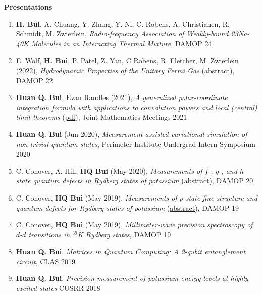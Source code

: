 \documentclass[10pt]{article}
\begin{document}

\noindent \large{\textbf{{Presentations}}}  \normalsize 

\begin{enumerate}
	\setlength\itemsep{-0pt}
	\item \textbf{H. Bui}, A. Chuang, Y. Zhang, Y. Ni, C. Robens, A. Christianen, R. Schmidt, M. Zwierlein, \textit{Radio-frequency Association of Weakly-bound 23Na-40K Molecules in an Interacting Thermal Mixture}, DAMOP 24
	
	\item E. Wolf, \textbf{H. Bui}, P. Patel, Z. Yan, C Robens, R. Fletcher, M. Zwierlein (2022), \textit{Hydrodynamic Properties of the Unitary Fermi Gas} (\href{https://meetings.aps.org/Meeting/DAMOP22/Session/N01.49}{abstract}), DAMOP 22
	
	\item \textbf{Huan Q. Bui}, Evan Randles (2021), \textit{A generalized polar-coordinate integration formula with applications to convolution powers and local (central) limit theorems} (\href{https://jointmathematicsmeetings.org/amsmtgs/2247_abstracts/1163-42-1122.pdf}{{pdf}}), Joint Mathematics Meetings 2021
	
	\item \textbf{Huan Q. Bui} (Jun 2020), \textit{Measurement-assisted variational simulation of non-trivial quantum states},
	Perimeter Institute Undergrad Intern Symposium 2020
	
	\item C. Conover, A. Hill, \textbf{HQ Bui} (May 2020), \textit{Measurements of $f$-, $g$-, and $h$-state quantum defects in Rydberg states of potassium} (\href{http://meetings.aps.org/Meeting/DAMOP20/Session/K01.17}{abstract}),  DAMOP 20
	
	\item C. Conover, \textbf{HQ Bui} (May 2019), \textit{Measurements of $p$-state fine structure and quantum defects for Rydberg states of potassium} (\href{https://ui.adsabs.harvard.edu/abs/2019APS..DMPL01169C/abstract}{{abstract}}), DAMOP 19
	
	\item C. Conover, \textbf{HQ Bui} (May 2019), \textit{Millimeter-wave precision spectroscopy of $d$-$d$ transitions in $^{\text{39}}$K Rydberg states},
	DAMOP 19
	
	\item \textbf{Huan Q. Bui}, \textit{Matrices in Quantum Computing: A 2-qubit entanglement circuit},
	CLAS 2019
	
	\item \textbf{Huan Q. Bui}, \textit{Precision measurement of potassium energy levels at highly excited states} 
	CUSRR 2018
\end{enumerate}
\end{document}
